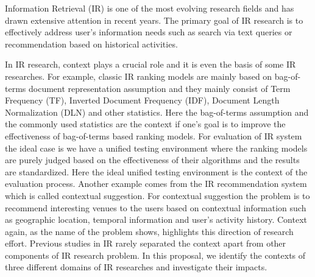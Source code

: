 %
%
Information Retrieval (IR) is one of the most evolving research fields 
and has drawn extensive attention in recent years. 
The primary goal of IR research is to effectively address user's 
information needs such as search via text queries or recommendation 
based on historical activities. 

In IR research, context plays a crucial role and it is even the basis 
of some IR researches.
For example, classic IR ranking models are mainly based on 
bag-of-terms document representation assumption and they mainly 
consist of Term Frequency (TF), Inverted Document Frequency (IDF), 
Document Length Normalization (DLN) and other statistics. 
Here the bag-of-terms assumption 
and the commonly used statistics are the context if one's goal is to 
improve the effectiveness of bag-of-terms based ranking models. 
For evaluation of IR system the ideal case is we have a unified testing 
environment where the ranking models are purely judged based on 
the effectiveness of their algorithms and the results are standardized. 
Here the ideal unified testing environment is the context of the 
evaluation process. 
Another example comes from the IR recommendation system which is called 
contextual suggestion. For contextual suggestion the problem is to recommend 
interesting venues to the users based on contextual information such as 
geographic location, temporal information and user's activity history. 
Context again, as the name of the problem shows, highlights this direction 
of research effort. 
Previous studies in IR rarely separated the context apart from other 
components of IR research problem. 
In this proposal, we identify the contexts of three different domains 
of IR researches and investigate their impacts. 

